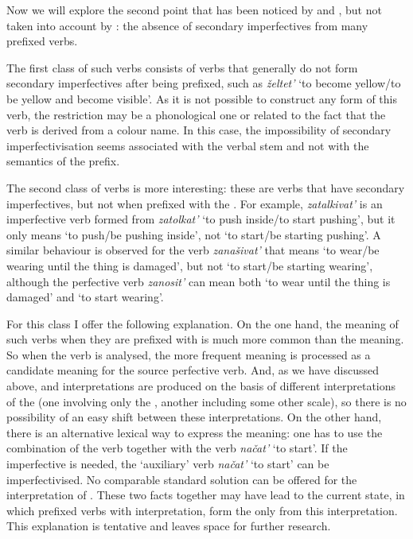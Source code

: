 Now we will explore the second point that has been noticed by \citet{Svenonius:04b} and \citet{Braginsky:08}, but not taken into account by \citet{Tatevosov:09}: the absence of secondary imperfectives from many  prefixed verbs. 

The first class of such verbs consists of verbs that generally do not form secondary imperfectives after being prefixed, such as \textit{\v{z}eltet'} `to become yellow/to be yellow and become visible'. As it is not possible to construct any  form of this verb, the restriction may be a phonological one or related to the fact that the verb is derived from a colour name. In this case, the impossibility of secondary imperfectivisation seems associated with the verbal stem and not with the  semantics of the prefix. 

The second class of verbs is more interesting: these are verbs that have secondary imperfectives, but not when prefixed with the  . For example, \textit{zatalkivat'} is an imperfective verb formed from \textit{zatolkat'} `to push inside/to start pushing', but it only means `to push/be pushing inside', not `to start/be starting pushing'. A similar behaviour is observed for the verb \textit{zana\v{s}ivat'} that means `to wear/be wearing until the thing is damaged', but not `to start/be starting wearing', although the perfective verb \textit{zanosit'} can mean both `to wear until the thing is damaged' and `to start wearing'.

For this class I offer the following explanation. On the one hand, the  meaning of such verbs when they are prefixed with  is much more common than the  meaning. So when the  verb is analysed, the more frequent meaning is processed as a candidate meaning for the source perfective verb. And, as we have discussed above,  and  interpretations are produced on the basis of different interpretations of the  (one involving only the , another including some other scale), so there is no possibility of an easy shift between these interpretations. On the other hand, there is an alternative lexical way to express the  meaning: one has to use the combination of the  verb together with the verb \textit{na\v{c}at'} `to start'. If the imperfective is needed, the `auxiliary' verb \textit{na\v{c}at'} `to start' can be imperfectivised. No comparable standard solution can be offered for the  interpretation of . These two facts together may have lead to the current state, in which prefixed verbs with  interpretation, form the  only from this interpretation. This explanation is tentative and leaves space for further research.

